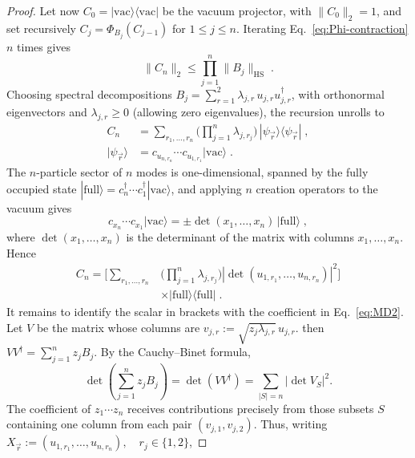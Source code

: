 \documentclass[prx,twocolumn,superscriptaddress,aps,10pt, frontmatterverbose, reprint,footinbib,longbibliography=true]{revtex4-2}
\begin{document}
\begin{proof}
Let now $C_0=|\mathrm{vac}\rangle\langle\mathrm{vac}|$ be the vacuum projector, with $\|C_0\|_{2}=1$, and set recursively $C_j=\Phi_{B_j}(C_{j-1})$ for $1\le j\le n$. Iterating Eq.~\eqref{eq:Phi-contraction} $n$ times gives
\begin{equation}
    \|C_n\|_{2}\le\prod_{j=1}^n\|B_j\|_{\mathrm{HS}}\;.
    \label{eq:Cn-bound}
\end{equation}
Choosing spectral decompositions $B_j=\sum_{r=1}^2\lambda_{j,r}\,u_{j,r}u_{j,r}^\dagger$, with orthonormal eigenvectors and $\lambda_{j,r}\ge0$ (allowing zero eigenvalues), the recursion unrolls to
\begin{equation}
\begin{split}
    C_n&=\sum_{r_1,\dots,r_n}\Big(\prod_{j=1}^n\lambda_{j,r_j}\Big)\,|\psi_{\vec r}\rangle\langle\psi_{\vec r}|\;,\\
    |\psi_{\vec r}\rangle&=c_{u_{n,r_n}}\cdots c_{u_{1,r_1}}|\mathrm{vac}\rangle\;.
    \end{split}
\end{equation}
The $n$-particle sector of $n$ modes is one-dimensional, spanned by the fully occupied state $|\mathrm{full}\rangle=c_n^\dagger\cdots c_1^\dagger|\mathrm{vac}\rangle$, and applying $n$ creation operators to the vacuum gives
\begin{equation}
    c_{x_n}\cdots c_{x_1}|\mathrm{vac}\rangle=\pm\det(x_1,\dots,x_n)\,|\mathrm{full}\rangle\;,
\end{equation}
where $\det(x_1,\dots,x_n)$ is the determinant of the matrix with columns $x_1,\dots,x_n$. Hence
\begin{equation}
\begin{split}C_n=\Big[\sum_{r_1,\dots,r_n}&\Big(\prod_{j=1}^n\lambda_{j,r_j}\Big)\left|\det(u_{1,r_1},\dots,u_{n,r_n})\right|^2\Big]\\
    &\times|\mathrm{full}\rangle\langle\mathrm{full}|\;.
\end{split}
\label{eq:Cn-scalar}
\end{equation}
It remains to identify the scalar in brackets with the coefficient in Eq.~\eqref{eq:MD2}. 
Let $V$ be the matrix whose columns are $v_{j,r}:=\sqrt{z_j\lambda_{j,r}}\,u_{j,r}.$
then $VV^\dagger=\sum_{j=1}^n z_jB_j$. By the Cauchy--Binet formula,
\begin{equation}
    \det\!\left(\sum_{j=1}^n z_jB_j\right)
=\det(VV^\dagger)
=\sum_{|S|=n} |\det V_S|^2 .
\end{equation}
The coefficient of $z_1\cdots z_n$ receives contributions precisely from
those subsets $S$ containing one column from each pair $(v_{j,1},v_{j,2})$. Thus, writing $X_{\vec r}:=(u_{1,r_1},\ldots,u_{n,r_n}),
\quad r_j\in\{1,2\}$,


\end{proof}
\end{document}
